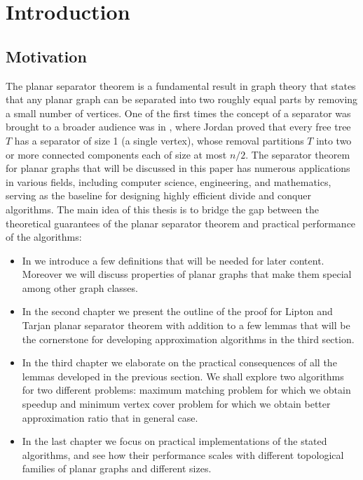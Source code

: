 \chapter{Introduction}

\section{Motivation}

The planar separator theorem is a fundamental result in graph theory that
states that any planar graph can be separated into two roughly equal parts
by removing a small number of vertices.
One of the first times the concept of a separator was brought to a broader audience was
in \cite{jordan1869assemblages}, where Jordan proved that every free tree $T$
has a separator of size 1 (a single vertex), whose removal partitions $T$ into
two or more connected components each of size at most $n/2$.
The separator theorem for planar graphs that will be discussed in this paper has numerous
applications in various fields, including computer science, engineering,
and mathematics, serving as the baseline for designing highly efficient 
divide and conquer algorithms. The main idea of this thesis is to bridge the 
gap between the theoretical guarantees of the planar separator theorem and
practical performance of the algorithms:
\begin{itemize}
    \item In  we introduce a few definitions that will be needed for
        later content. Moreover we will discuss properties of planar graphs
        that make them special among other graph classes.
    \item In the second chapter we present the outline of the proof for 
        Lipton and Tarjan planar separator theorem with addition to a few 
        lemmas that will be the cornerstone for developing approximation 
        algorithms in the third section.
    \item In the third chapter we elaborate on the practical consequences of 
        all the lemmas developed in the previous section. We shall explore 
        two algorithms for two different problems: maximum matching problem for 
        which we obtain speedup
        and minimum vertex cover problem for which we obtain better approximation
        ratio that in general case.
    \item In the last chapter we focus on practical implementations of 
        the stated algorithms, and see how their performance scales with different
        topological families of planar graphs and different sizes.
\end{itemize}




